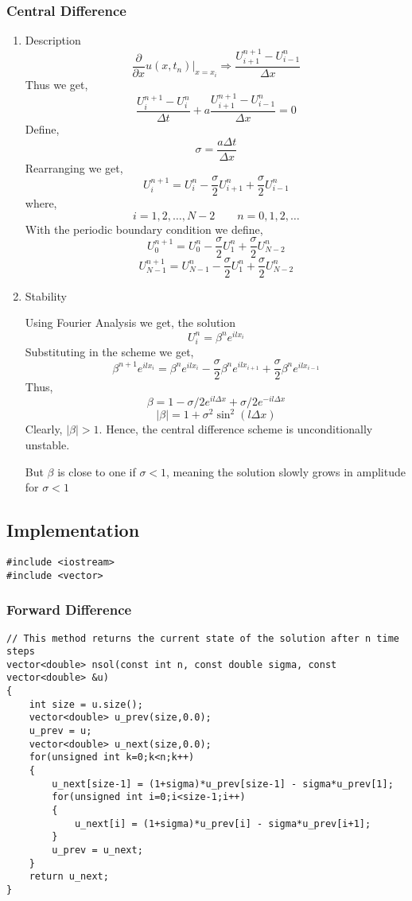 \documentclass[11pt]{article}
\begin{document}
\subsubsection{Central Difference}
\label{sec:org0beb050}
\begin{enumerate}
\item Description
\label{sec:orgbb1a0b0}
$$\frac{\partial}{\partial x} u(x,t_n) \bigg|_{x=x_i} \Rightarrow \frac{U_{i+1}^{n+1} - U_{i-1}^n}{\Delta x}$$
Thus we get,
$$\frac{U_i^{n+1} - U_i^n}{\Delta t} + a \frac{U_{i+1}^{n+1} - U_{i-1}^n}{\Delta x} = 0$$
Define,
$$\sigma = \frac{a \Delta t}{\Delta x}$$
Rearranging we get,
$$U_i^{n+1} = U_i^n - \frac{\sigma}{2} U_{i+1}^n + \frac{\sigma}{2} U_{i-1}^n$$
where,
$$i=1,2,\ldots,N-2 \qquad n = 0,1,2,\ldots$$
With the periodic boundary condition we define,
$$U_0^{n+1} = U_0^n - \frac{\sigma}{2} U_{1}^n + \frac{\sigma}{2} U_{N-2}^n$$
$$U_{N-1}^{n+1} = U_{N-1}^n - \frac{\sigma}{2} U_{1}^n + \frac{\sigma}{2} U_{N-2}^n$$
\item Stability
\label{sec:org820b7a5}

Using Fourier Analysis we get, the solution
$$U_i^n = \beta^n e^{i l x_i}$$
Substituting in the scheme we get,
$$\beta^{n+1} e^{i l x_i} = \beta^n e^{i l x_i} - \frac{\sigma}{2} \beta^n e^{i l x_{i+1}} + \frac{\sigma}{2} \beta^{n} e^{i l x_{i-1}}$$
Thus,
$$\beta = 1 - \sigma/2 e^{i l \Delta x} + \sigma/2 e^{- i l \Delta x}$$
$$\lvert \beta \rvert = 1 + \sigma^{2} \sin^{2} (l \Delta x)$$
Clearly, \(\lvert \beta \rvert > 1\). Hence, the central difference scheme is unconditionally unstable.

But \(\beta\) is close to one if \(\sigma < 1\), meaning the solution slowly grows in amplitude for \(\sigma < 1\)
\end{enumerate}
\subsection{Implementation}
\label{sec:org303aae6}
\begin{verbatim}
#include <iostream>
#include <vector>
\end{verbatim}

\subsubsection{Forward Difference}
\label{sec:orge51151f}
\begin{verbatim}
// This method returns the current state of the solution after n time steps
vector<double> nsol(const int n, const double sigma, const vector<double> &u)
{
    int size = u.size();
    vector<double> u_prev(size,0.0);
    u_prev = u;
    vector<double> u_next(size,0.0);
    for(unsigned int k=0;k<n;k++)
    {
        u_next[size-1] = (1+sigma)*u_prev[size-1] - sigma*u_prev[1];
        for(unsigned int i=0;i<size-1;i++)
        {
            u_next[i] = (1+sigma)*u_prev[i] - sigma*u_prev[i+1];
        }
        u_prev = u_next;
    }
    return u_next;
}
\end{verbatim}
\end{document}
